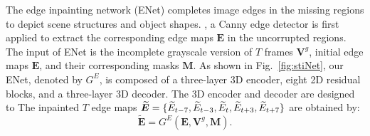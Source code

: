 The edge inpainting network (ENet) completes image edges in the missing regions to depict scene structures and object shapes.
, a Canny edge detector is first applied to extract the corresponding edge maps $\boldsymbol{E}$ in the uncorrupted regions. %
The input of ENet is  the incomplete grayscale version of $T$ frames $\boldsymbol{V}^{g}$, initial edge maps $\boldsymbol{E}$, and their corresponding masks $\boldsymbol{M}$.
%
As shown in Fig.~\ref{fig:stiNet}, our ENet, denoted by $G^E$, is composed of a three-layer 3D encoder, eight 2D residual blocks, and a three-layer 3D decoder. 
The 3D encoder and decoder are designed to 
The inpainted $T$ edge maps 	$\boldsymbol{\widetilde{E}}=\{\widetilde{E}_{t-7},\widetilde{E}_{t-3},\widetilde{E}_{t},\widetilde{E}_{t+3},\widetilde{E}_{t+7}\}$ are obtained by:
\begin{equation}
	\label{eq:edgenet}
	\boldsymbol{\widetilde{E}}=G^E(\boldsymbol{E},\boldsymbol{V}^{g},\boldsymbol{M}).
\end{equation}

